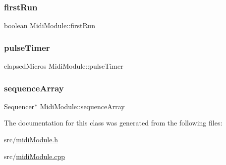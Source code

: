 \mbox{\label{class_midi_module_a819a46463bb610739ecd87a152fb4ea3}} 
\subsubsection{\texorpdfstring{first\+Run}{firstRun}}
{\footnotesize\ttfamily boolean Midi\+Module\+::first\+Run\hspace{0.3cm}{\ttfamily [private]}}

\mbox{\label{class_midi_module_a94669a447b35f1bfbbe8a335335dc789}} 
\subsubsection{\texorpdfstring{pulse\+Timer}{pulseTimer}}
{\footnotesize\ttfamily elapsed\+Micros Midi\+Module\+::pulse\+Timer\hspace{0.3cm}{\ttfamily [private]}}

\mbox{\label{class_midi_module_ab407f65f92a693100a5c638f1cde14c0}} 
\subsubsection{\texorpdfstring{sequence\+Array}{sequenceArray}}
{\footnotesize\ttfamily Sequencer$\ast$ Midi\+Module\+::sequence\+Array\hspace{0.3cm}{\ttfamily [private]}}



The documentation for this class was generated from the following files\+:\begin{DoxyCompactItemize}
\item 
src/\hyperlink{midi_module_8h}{midi\+Module.\+h}\item 
src/\hyperlink{midi_module_8cpp}{midi\+Module.\+cpp}\end{DoxyCompactItemize}
